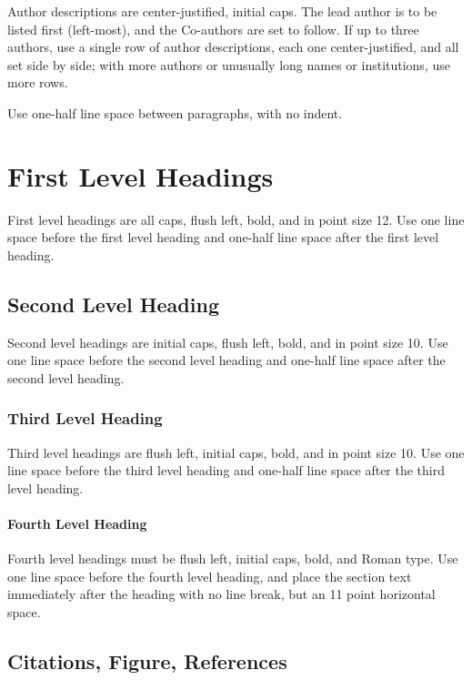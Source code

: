 \documentclass[twoside]{article}
\begin{document}
Author descriptions are center-justified, initial caps.  The lead
author is to be listed first (left-most), and the Co-authors are set
to follow.  If up to three authors, use a single row of author
descriptions, each one center-justified, and all set side by side;
with more authors or unusually long names or institutions, use more
rows.

Use one-half line space between paragraphs, with no indent.

\section{First Level Headings}

First level headings are all caps, flush left, bold, and in point size
12. Use one line space before the first level heading and one-half line space
after the first level heading.

\subsection{Second Level Heading}

Second level headings are initial caps, flush left, bold, and in point
size 10. Use one line space before the second level heading and one-half line
space after the second level heading.

\subsubsection{Third Level Heading}

Third level headings are flush left, initial caps, bold, and in point
size 10. Use one line space before the third level heading and one-half line
space after the third level heading.

\paragraph{Fourth Level Heading}

Fourth level headings must be flush left, initial caps, bold, and
Roman type.  Use one line space before the fourth level heading, and
place the section text immediately after the heading with no line
break, but an 11 point horizontal space.

\subsection{Citations, Figure, References}
\end{document}
